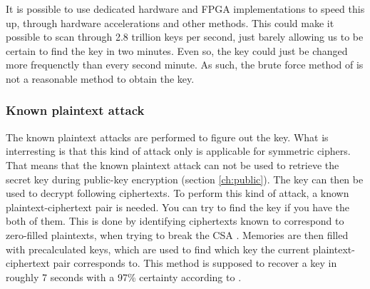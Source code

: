 It is possible to use dedicated hardware and FPGA implementations to 
speed this up, through hardware accelerations and other methods. This 
could make it possible to scan through 2.8 trillion keys per second, 
just barely allowing us to be certain to find the key in two minutes. 
Even so, the key could just be changed more frequenctly than every 
second minute. As such, the brute force method of is not a reasonable 
method to obtain the key.

\subsubsection{Known plaintext attack}\label{sec:kpa}
The known plaintext attacks are performed to figure out the key. What 
is interresting is that this kind of attack only is applicable for 
symmetric ciphers. That means that the known plaintext attack can not 
be used to retrieve the secret key during public-key encryption 
(section \ref{ch:public}). The key can then be used to decrypt 
following ciphertexts. To perform this kind of attack, a known 
plaintext-ciphertext pair is needed. You can try to find the key if 
you have the both of them. This is done by identifying ciphertexts 
known to correspond to zero-filled plaintexts, when trying to break the 
CSA \citep{Breaking:2012}. Memories are then filled with precalculated 
keys, which are used to find which key the current plaintext-ciphertext 
pair corresponds to. This method is supposed to recover a key in 
roughly 7 seconds with a 97\% certainty according to 
\citet{Breaking:2012}.
